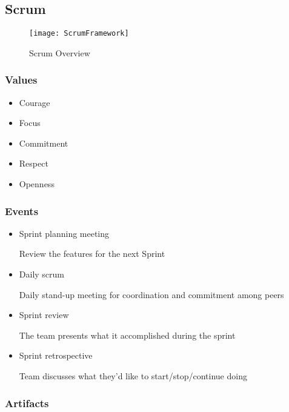 \documentclass[../ESOF_notes.tex]{subfiles}
\begin{document}
 

\subsection{Scrum}

\begin{figure}[H]
    \centering
    \texttt{[image: ScrumFramework]}
    \caption{Scrum Overview}
\end{figure}

\subsubsection{Values}

\begin{itemize}
    \item Courage
    
    \item Focus
    
    \item Commitment
    
    \item Respect
    
    \item Openness
\end{itemize}

\subsubsection{Events}

\begin{itemize}
    \item Sprint planning meeting
    
    Review the features for the next Sprint
    \item Daily scrum
    
    Daily stand-up meeting for coordination and commitment among peers
    \item Sprint review
    
    The team presents what it accomplished during the sprint
    \item Sprint retrospective
    
    Team discusses what they'd like to start/stop/continue doing
\end{itemize}

\subsubsection{Artifacts}
\end{document}

